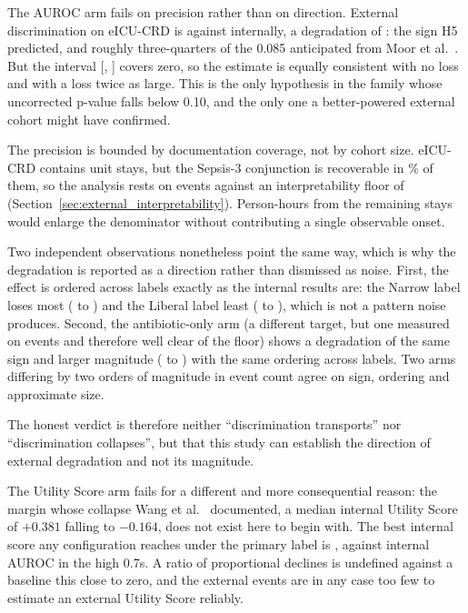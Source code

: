 The AUROC arm fails on precision rather than on direction. External
discrimination on eICU-CRD is \pcExtAurocPrimaryB{} against \pcAurocPrimaryB{}
internally, a degradation of \pcHFiveEst{}: the sign H5 predicted, and
roughly three-quarters of the 0.085 anticipated from Moor et al.\
\cite{moor2023review}. But the interval [\pcHFiveCiLo, \pcHFiveCiHi] covers
zero, so the estimate is equally consistent with no loss and with a loss twice
as large. This is the only hypothesis in the family whose uncorrected p-value
falls below 0.10, and the only one a better-powered external cohort might have
confirmed.

The precision is bounded by documentation coverage, not by cohort size.
eICU-CRD contains \pcExtNCohortStays{} unit stays, but the Sepsis-3 conjunction
is recoverable in \pcExtMicroCoverage\% of them, so the analysis rests on
\pcExtNEventsB{} events against an interpretability floor of \pcExtMinEvents{}
(Section~\ref{sec:external_interpretability}). Person-hours from the remaining
stays would enlarge the denominator without contributing a single observable
onset.

Two independent observations nonetheless point the same way, which is why the
degradation is reported as a direction rather than dismissed as noise. First,
the effect is ordered across labels exactly as the internal results are: the
Narrow label loses most (\pcAurocPrimaryA{} to \pcExtAurocPrimaryA) and the
Liberal label least (\pcAurocPrimaryC{} to \pcExtAurocPrimaryC), which is not a
pattern noise produces. Second, the antibiotic-only arm (a different target,
but one measured on \pcExtAbxNEventsB{} events and therefore well clear of the
floor) shows a degradation of the same sign and larger magnitude
(\pcAurocPrimaryB{} to \pcExtAbxAurocPrimaryB) with the same ordering across
labels. Two arms differing by two orders of magnitude in event count agree on
sign, ordering and approximate size.

The honest verdict is therefore neither ``discrimination transports'' nor
``discrimination collapses'', but that this study can establish the direction of
external degradation and not its magnitude.

The Utility Score arm fails for a different and more consequential reason: the
margin whose collapse Wang et al.\ \cite{wang2025srpm} documented, a median internal Utility Score of $+0.381$ falling to $-0.164$, does not
exist here to begin with. The best internal score any configuration reaches
under the primary label is \pcUtilityMaxGbtB, against internal AUROC in the high
0.7s. A ratio of proportional declines is undefined against a baseline this
close to zero, and the \pcExtNEventsB{} external events are in any case too few
to estimate an external Utility Score reliably.

